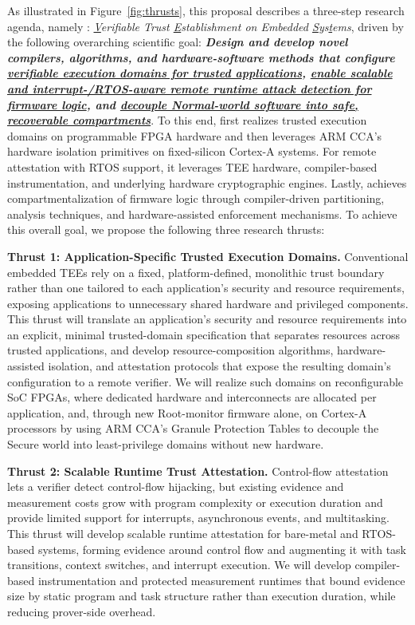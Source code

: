 As illustrated in Figure~\ref{fig:thrusts}, this proposal describes a three-step research agenda, namely \sys: \textit{\underline{V}erifiable Trust \underline{E}stablishment on Embedded \underline{S}ys\underline{t}ems}, driven by the following overarching scientific goal: \textbf{\textit{Design and develop novel compilers, algorithms, and hardware-software methods that configure \ul{verifiable execution domains for trusted applications}, \ul{enable scalable and interrupt-/RTOS-aware remote runtime attack detection for firmware logic}, and \ul{decouple Normal-world software into safe, recoverable compartments}}}.
To this end, \sys first realizes trusted execution domains on programmable FPGA hardware and then leverages ARM CCA's hardware isolation primitives on fixed-silicon Cortex-A systems.
For remote attestation with RTOS support, it leverages TEE hardware, compiler-based instrumentation, and underlying hardware cryptographic engines.
Lastly, \sys achieves compartmentalization of firmware logic through compiler-driven partitioning, analysis techniques, and hardware-assisted enforcement mechanisms.
To achieve this overall goal, we propose the following three research thrusts:

\textbf{Thrust 1: Application-Specific Trusted Execution Domains.}
Conventional embedded TEEs rely on a fixed, platform-defined, monolithic trust boundary rather than one tailored to each application's security and resource requirements, exposing applications to unnecessary shared hardware and privileged components.
This thrust will translate an application's security and resource requirements into an explicit, minimal trusted-domain specification that separates resources across trusted applications, and develop resource-composition algorithms, hardware-assisted isolation, and attestation protocols that expose the resulting domain's configuration to a remote verifier.
We will realize such domains on reconfigurable SoC FPGAs, where dedicated hardware and interconnects are allocated per application, and, through new Root-monitor firmware alone, on Cortex-A processors by using ARM CCA's Granule Protection Tables to decouple the Secure world into least-privilege domains without new hardware.

\textbf{Thrust 2: Scalable Runtime Trust Attestation.}
Control-flow attestation lets a verifier detect control-flow hijacking, but existing evidence and measurement costs grow with program complexity or execution duration and provide limited support for interrupts, asynchronous events, and multitasking.
This thrust will develop scalable runtime attestation for bare-metal and RTOS-based systems, forming evidence around control flow and augmenting it with task transitions, context switches, and interrupt execution.
We will develop compiler-based instrumentation and protected measurement runtimes that bound evidence size by static program and task structure rather than execution duration, while reducing prover-side overhead.

